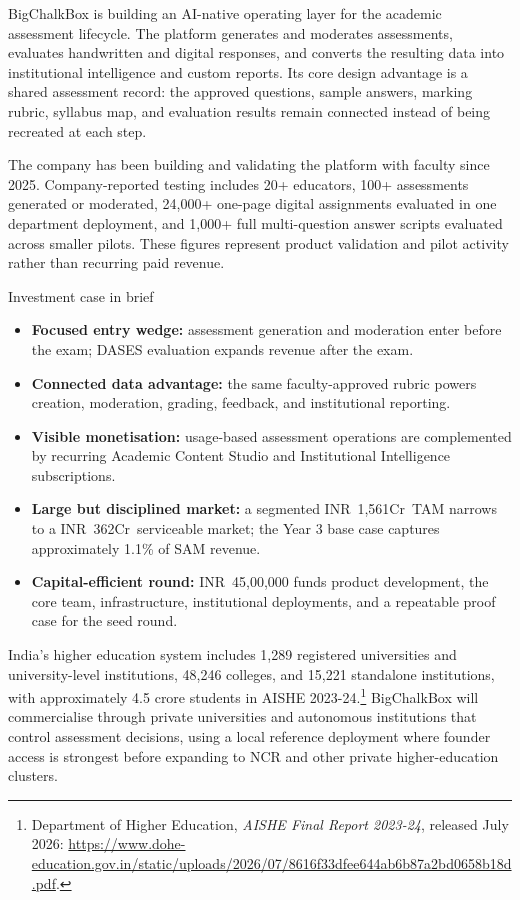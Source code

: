 \documentclass[11pt,a4paper]{article}
\newcommand{\rs}{INR}
\newcommand{\crore}{Cr}
\begin{document}
BigChalkBox is building an AI-native operating layer for the academic assessment lifecycle. The platform generates and moderates assessments, evaluates handwritten and digital responses, and converts the resulting data into institutional intelligence and custom reports. Its core design advantage is a shared assessment record: the approved questions, sample answers, marking rubric, syllabus map, and evaluation results remain connected instead of being recreated at each step.

The company has been building and validating the platform with faculty since 2025. Company-reported testing includes 20+ educators, 100+ assessments generated or moderated, 24,000+ one-page digital assignments evaluated in one department deployment, and 1,000+ full multi-question answer scripts evaluated across smaller pilots. These figures represent product validation and pilot activity rather than recurring paid revenue.

\begin{bluebox}{Investment case in brief}
\begin{itemize}
  \item \textbf{Focused entry wedge:} assessment generation and moderation enter before the exam; DASES evaluation expands revenue after the exam.
  \item \textbf{Connected data advantage:} the same faculty-approved rubric powers creation, moderation, grading, feedback, and institutional reporting.
  \item \textbf{Visible monetisation:} usage-based assessment operations are complemented by recurring Academic Content Studio and Institutional Intelligence subscriptions.
  \item \textbf{Large but disciplined market:} a segmented \rs\ 1,561\crore\ TAM narrows to a \rs\ 362\crore\ serviceable market; the Year 3 base case captures approximately 1.1\% of SAM revenue.
  \item \textbf{Capital-efficient round:} \rs\ 45,00,000 funds product development, the core team, infrastructure, institutional deployments, and a repeatable proof case for the seed round.
\end{itemize}
\end{bluebox}

India's higher education system includes 1,289 registered universities and university-level institutions, 48,246 colleges, and 15,221 standalone institutions, with approximately 4.5 crore students in AISHE 2023-24.\footnote{Department of Higher Education, \textit{AISHE Final Report 2023-24}, released July 2026: \url{https://www.dohe-education.gov.in/static/uploads/2026/07/8616f33dfee644ab6b87a2bd0658b18d.pdf}.} BigChalkBox will commercialise through private universities and autonomous institutions that control assessment decisions, using a local reference deployment where founder access is strongest before expanding to NCR and other private higher-education clusters.
\end{document}
